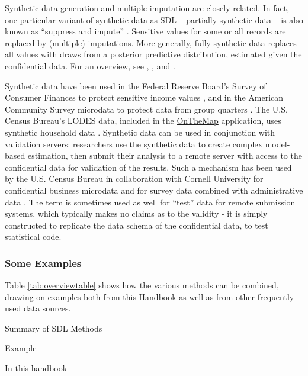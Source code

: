 \documentclass[
]{WileySix}
\begin{document}
Synthetic data generation and multiple imputation are closely related. In fact, one particular variant of synthetic data as SDL -- partially synthetic data -- is also known as ``suppress and impute'' \citep{little_statistical_1993}. Sensitive values for some or all records are replaced by (multiple) imputations. More generally, fully synthetic data \citep{rubin_discussion_1993} replaces all values with draws from a posterior predictive distribution, estimated given the confidential data. For an overview, see \citet{raghunathan_multiple_2003}, \citet{little_statistical_2004}, and \citet{drechsler_synthetic_2011}.

Synthetic data have been used in the Federal Reserve Board's Survey of Consumer Finances to protect sensitive income values \citep{kennickell_multiple_1998}, and in the American Community Survey microdata to protect data from group quarters \citep[such as prisons and university residences; see][]{hawala_disclosure_2009}. The U.S. Census Bureau's LODES data, included in the \href{https://onthemap.ces.census.gov/}{OnTheMap} application, uses synthetic household data \citep{machanavajjhala_privacy_2008}. Synthetic data can be used in conjunction with validation servers: researchers use the synthetic data to create complex model-based estimation, then submit their analysis to a remote server with access to the confidential data for validation of the results. Such a mechanism has been used by the U.S. Census Bureau in collaboration with Cornell University for confidential business microdata \citep{kinney_towards_2011} and for survey data combined with administrative data \citep{abowd_final_2006}. The term is sometimes used as well for ``test'' data for remote submission systems, which typically makes no claims as to the validity - it is simply constructed to replicate the data schema of the confidential data, to test statistical code.

\hypertarget{some-examples}{%
\subsubsection{Some Examples}\label{some-examples}}

Table \ref{tab:overviewtable} shows how the various methods can be combined, drawing on examples both from this Handbook as well as from other frequently used data sources.

\label{tab:overviewtable}Summary of SDL Methods

Example

In this handbook
\end{document}
